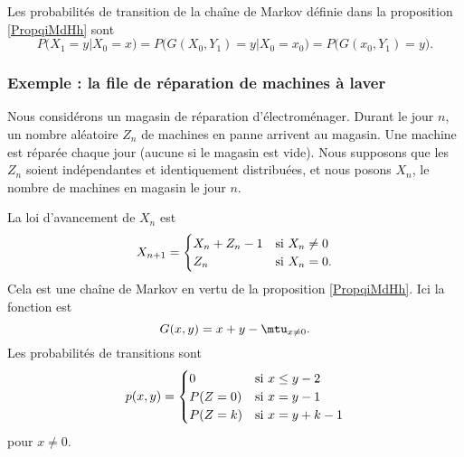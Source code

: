 Les probabilités de transition de la chaîne de Markov définie dans la proposition \ref{PropqiMdHh} sont
\begin{equation}
    P(X_1=y|X_0=x)=P\big( G(X_0,Y_1)=y|X_0=x_0 \big)=P\big( G(x_0,Y_1)=y \big).
\end{equation}

\subsubsection{Exemple : la file de réparation de machines à laver}

Nous considérons un magasin de réparation d'électroménager. Durant le jour \( n\), un nombre aléatoire \( Z_{n}\) de machines en panne arrivent au magasin. Une machine est réparée chaque jour (aucune si le magasin est vide). Nous supposons que les \( Z_n\) soient indépendantes et identiquement distribuées, et nous posons \( X_n\), le nombre de machines en magasin le jour \( n\).

La loi d'avancement de \( X_n\) est
\begin{equation}
    X_{n+1}=\begin{cases}
        X_n+Z_n-1    &   \text{si \( X_n\neq 0\)}\\
        Z_n    &    \text{si \( X_n=0\)}.
    \end{cases}
\end{equation}
Cela est une chaîne de Markov en vertu de la proposition \ref{PropqiMdHh}. Ici la fonction est
\begin{equation}
    G(x,y)=x+y-\mtu_{x\neq 0}.
\end{equation}
Les probabilités de transitions sont 
\begin{equation}
    p(x,y)=\begin{cases}
        0    &   \text{si \( x\leq y-2\)}\\
        P(Z=0)    &    \text{si \( x=y-1\)}\\
        P(Z=k)&\text{si \( x=y+k-1\)}
    \end{cases}
\end{equation}
pour \( x\neq 0\).



